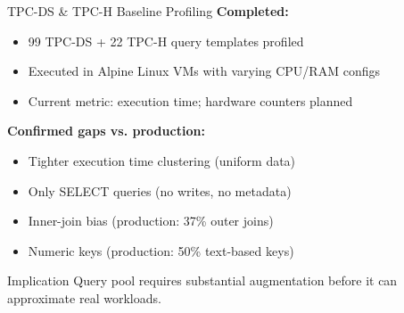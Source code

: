 \documentclass[aspectratio=169]{beamer}
\begin{document}
\begin{frame}{TPC-DS \& TPC-H Baseline Profiling}
    \textbf{Completed:}
    \begin{itemize}
        \item 99 TPC-DS + 22 TPC-H query templates profiled
        \item Executed in Alpine Linux VMs with varying CPU/RAM configs
        \item Current metric: execution time; hardware counters planned
    \end{itemize}
    
    \vspace{0.3cm}
    \textbf{Confirmed gaps vs. production:}
    \begin{itemize}
        \item Tighter execution time clustering (uniform data)
        \item Only SELECT queries (no writes, no metadata)
        \item Inner-join bias (production: 37\% outer joins)
        \item Numeric keys (production: 50\% text-based keys)
    \end{itemize}
    
    \vspace{0.3cm}
    \begin{alertblock}{Implication}
        Query pool requires substantial augmentation before it can approximate real workloads.
    \end{alertblock}
\end{frame}
\end{document}
